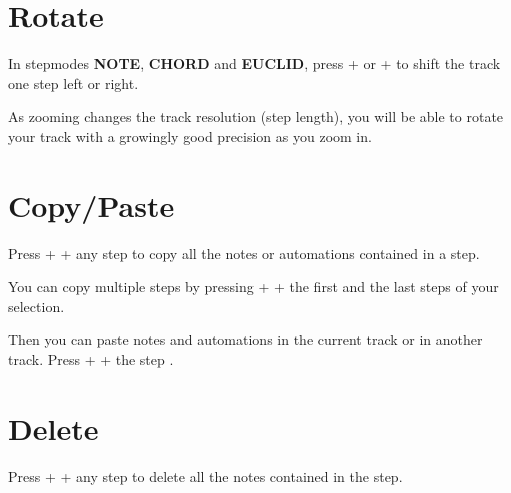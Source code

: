 



\section{Rotate}

In stepmodes \textbf{NOTE}, \textbf{CHORD} and \textbf{EUCLID}, press  + \btn{<} or  + \btn{>}  to shift the track one step left or right.

As zooming changes the track resolution (step length), you will be able to rotate your track with a growingly good precision as you zoom in.



\section{Copy/Paste}

Press  +  + any step \padsicon{} to copy all the notes or automations contained in a step.

You can copy multiple steps by pressing   +  + the first and the last steps \stepbystepicon{} of your selection.

Then you can paste notes and automations in the current track or in another track. Press   +  + the step \padsicon{}.



\section{Delete}

Press  +  + any step \padsicon{} to delete all the notes contained in the step.



